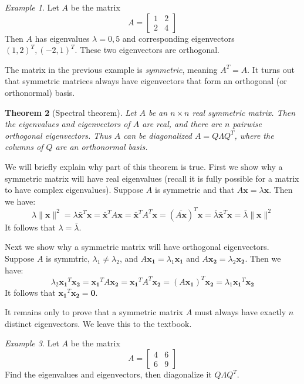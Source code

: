 \documentclass[11pt,oneside]{amsbook}
\theoremstyle{definition}
\theoremstyle{plain}
\newtheorem{theorem}{Theorem}[section]
\theoremstyle{definition}
\theoremstyle{remark}
\newtheorem{example}[theorem]{Example}
\numberwithin{equation}{section}
\numberwithin{figure}{section}
\begin{document}
\begin{example}
  Let $A$ be the matrix
  \[A=\begin{bmatrix}1&2\\2&4\end{bmatrix}
  \]
  Then $A$ has eigenvalues $\lambda=0,5$ and corresponding eigenvectors $(1,2)^T,(-2,1)^T$. These two eigenvectors are orthogonal.
\end{example}

The matrix in the previous example is \emph{symmetric}, meaning $A^T=A$. It turns out that symmetric matrices always have eigenvectors that form an orthogonal (or orthonormal) basis.

\begin{theorem}[Spectral theorem]
  Let $A$ be an $n\times n$ real symmetric matrix. Then the eigenvalues and eigenvectors of $A$ are real, and there are $n$ pairwise orthogonal eigenvectors. Thus $A$ can be diagonalized $A=Q\Lambda Q^T$, where the columns of $Q$ are an orthonormal basis.
\end{theorem}

We will briefly explain why part of this theorem is true. First we show why a symmetric matrix will have real eigenvalues (recall it is fully possible for a matrix to have complex eigenvalues). Suppose $A$ is symmetric and that $A\bm{x}=\lambda\bm{x}$. Then we have:
\[\lambda\|\bm{x}\|^2=\lambda \bar{\bm{x}}^T\bm{x}
  =\bar{\bm{x}}^TA\bm{x}
  =\bar{\bm{x}}^TA^T\bm{x}
  =(\overline{A\bm{x}})^T\bm{x}
  =\bar\lambda\bar{\bm{x}}^T\bm{x}
  =\bar\lambda\|\bm{x}\|^2
\]
It follows that $\lambda=\bar\lambda$.

Next we show why a symmetric matrix will have orthogonal eigenvectors. Suppose $A$ is symmtric, $\lambda_1\neq\lambda_2$, and $A\bm{x_1}=\lambda_1\bm{x_1}$ and $A\bm{x_2}=\lambda_2\bm{x_2}$. Then we have:
\[\lambda_2\bm{x_1}^T\bm{x_2}
  =\bm{x_1}^TA\bm{x_2}
  =\bm{x_1}^TA^T\bm{x_2}
  =(A\bm{x_1})^T\bm{x_2}
  =\lambda_1\bm{x_1}^T\bm{x_2}
\]
It follows that $\bm{x_1}^T\bm{x_2}=\bm{0}$.

It remains only to prove that a symmetric matrix $A$ must always have exactly $n$ distinct eigenvectors. We leave this to the textbook.

\begin{example}
  Let $A$ be the matrix
  \[A=\begin{bmatrix}4&6\\6&9\end{bmatrix}
  \]
  Find the eigenvalues and eigenvectors, then diagonalize it $Q\Lambda Q^T$.
\end{example}
\end{document}
